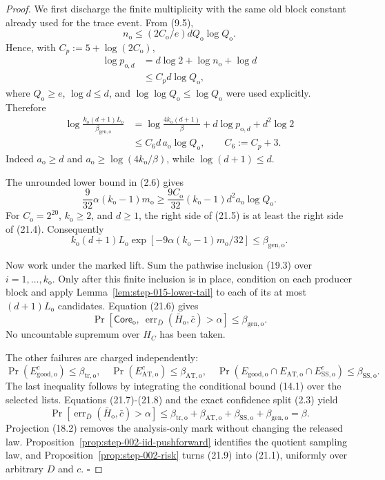 \begin{proof}
We first discharge the finite multiplicity with the same old block
constant already used for the trace event. From (9.5),
\[
n_{\mathrm o}\le(2C_{\mathrm o}/e)dQ_{\mathrm o}\log Q_{\mathrm o}.
\tag{21.2}
\]
Hence, with
\(C_p:=5+\log(2C_{\mathrm o})\),
\[
\begin{aligned}
\log p_{\mathrm o,d}
&=d\log2+\log n_{\mathrm o}+\log d\\
&\le C_p d\log Q_{\mathrm o},
\end{aligned}
\tag{21.3}
\]
where \(Q_{\mathrm o}\ge e\), \(\log d\le d\), and
\(\log\log Q_{\mathrm o}\le\log Q_{\mathrm o}\) were used explicitly.
Therefore
\[
\begin{aligned}
\log\frac{k_{\mathrm o}(d+1)L_{\mathrm o}}
{\beta_{\mathrm{gen,o}}}
&=\log\frac{4k_{\mathrm o}(d+1)}\beta
+d\log p_{\mathrm o,d}+d^2\log2\\
&\le C_6d\,a_{\mathrm o}\log Q_{\mathrm o},
\qquad C_6:=C_p+3.
\end{aligned}
\tag{21.4}
\]
Indeed \(a_{\mathrm o}\ge d\) and
\(a_{\mathrm o}\ge\log(4k_{\mathrm o}/\beta)\), while
\(\log(d+1)\le d\).

The unrounded lower bound in (2.6) gives
\[
\frac9{32}\alpha(k_{\mathrm o}-1)m_{\mathrm o}
\ge\frac{9C_{\mathrm o}}{32}
(k_{\mathrm o}-1)d^2a_{\mathrm o}\log Q_{\mathrm o}.
\tag{21.5}
\]
For \(C_{\mathrm o}=2^{20}\), \(k_{\mathrm o}\ge2\), and \(d\ge1\),
the right side of (21.5) is at least the right side of (21.4).
Consequently
\[
k_{\mathrm o}(d+1)L_{\mathrm o}
\exp[-9\alpha(k_{\mathrm o}-1)m_{\mathrm o}/32]
\le\beta_{\mathrm{gen,o}}.
\tag{21.6}
\]

Now work under the marked lift. Sum the pathwise inclusion (19.3) over
\(i=1,\ldots,k_{\mathrm o}\). Only after this finite inclusion is in
place, condition on each producer block and apply
Lemma~\ref{lem:step-015-lower-tail} to each of its at most
\((d+1)L_{\mathrm o}\) candidates. Equation (21.6) gives
\[
\Pr[
\mathsf{Core}_{\mathrm o},\
\operatorname{err}_{\bar D}(\bar H_{\mathrm o},\bar c)>\alpha]
\le\beta_{\mathrm{gen,o}}.
\tag{21.7}
\]
No uncountable supremum over \(H_C\) has been taken.

The other failures are charged independently:
\[
\Pr(E_{\mathrm{good,o}}^c)\le\beta_{\mathrm{tr,o}},
\quad
\Pr(E_{\mathrm{AT,o}}^c)\le\beta_{\mathrm{AT,o}},
\quad
\Pr(E_{\mathrm{good,o}}\cap E_{\mathrm{AT,o}}
\cap E_{\mathrm{SS,o}}^c)\le\beta_{\mathrm{SS,o}}.
\tag{21.8}
\]
The last inequality follows by integrating the conditional bound (14.1)
over the selected lists. Equations (21.7)-(21.8) and the exact confidence
split (2.3) yield
\[
\Pr[
\operatorname{err}_{\bar D}(\bar H_{\mathrm o},\bar c)>\alpha]
\le\beta_{\mathrm{tr,o}}+\beta_{\mathrm{AT,o}}
+\beta_{\mathrm{SS,o}}+\beta_{\mathrm{gen,o}}
=\beta.
\tag{21.9}
\]
Projection (18.2) removes the analysis-only mark without changing the
released law. Proposition~\ref{prop:step-002-iid-pushforward}
identifies the quotient sampling law, and Proposition~\ref{prop:step-002-risk} turns (21.9) into (21.1), uniformly
over arbitrary \(D\) and \(c\). \(\square\)


\end{proof}

